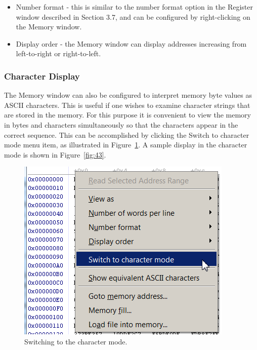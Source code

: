 \documentclass[11pt, twoside, pdftex]{article}
\begin{document}
\begin{itemize}
\item Number format - this is similar to the number format option in the Register window described in Section 3.7,
and can be configured by right-clicking on the Memory window.

\item Display order - the Memory window can display addresses
increasing from left-to-right or right-to-left. 
\end{itemize}

\subsubsection{Character Display}

The \textsf{Memory} window can also be configured to interpret
memory byte values as ASCII characters. 
This is useful if one wishes to examine character strings that 
are stored in the memory.
For this purpose it is convenient to view
the memory in bytes and characters simultaneously so that the
characters appear in the correct sequence. This can be
accomplished by clicking the {\sf Switch to character mode} menu
item, as illustrated in Figure~\ref{fig:42}. A sample display in the
character mode is shown in Figure~\ref{fig:43}.
  
\begin{figure}[H]
   \begin{center}
      \includegraphics[scale=1]{screenshots/figure42.png}
   \end{center}
   \caption{Switching to the character mode.}
	 \label{fig:42}
\end{figure}
\end{document}
